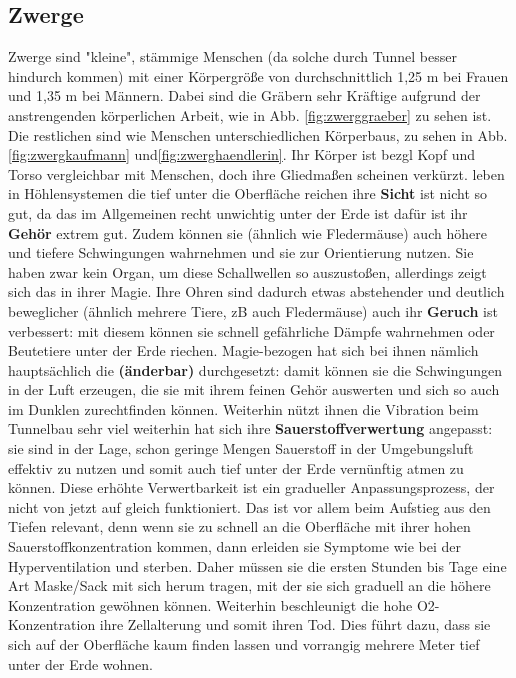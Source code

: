 \subsection{Zwerge} \label{rasse:zwerg}
\begin{outline}
	\1  Zwerge sind "kleine", stämmige Menschen (da solche durch Tunnel besser hindurch kommen) mit einer Körpergröße von durchschnittlich 1,25 m bei Frauen und 1,35 m bei Männern.
	 Dabei sind die Gräbern sehr Kräftige aufgrund der anstrengenden körperlichen Arbeit, wie in Abb. \ref{fig:zwerggraeber} zu sehen ist. 
	 Die restlichen sind wie Menschen unterschiedlichen Körperbaus, zu sehen in Abb. \ref{fig:zwergkaufmann} und\ref{fig:zwerghaendlerin}. 
	 Ihr Körper ist bezgl Kopf und Torso vergleichbar mit Menschen, doch ihre Gliedmaßen scheinen verkürzt.
	\1 leben in Höhlensystemen die tief unter die Oberfläche reichen
	\1 ihre \textbf{Sicht} ist nicht so gut, da das im Allgemeinen recht unwichtig unter der Erde ist
	\1 dafür ist ihr \textbf{Gehör} extrem gut. 
	Zudem können sie (ähnlich wie Fledermäuse) auch höhere und tiefere Schwingungen wahrnehmen und sie zur Orientierung nutzen. 
	Sie haben zwar kein Organ, um diese Schallwellen so auszustoßen, allerdings zeigt sich das in ihrer Magie. 
	Ihre Ohren sind dadurch etwas abstehender und deutlich beweglicher (ähnlich mehrere Tiere, zB auch Fledermäuse)
	\1 auch ihr \textbf{Geruch} ist verbessert: 
	mit diesem können sie schnell gefährliche Dämpfe wahrnehmen oder Beutetiere unter der Erde riechen.
	\1 Magie-bezogen hat sich bei ihnen nämlich hauptsächlich die \textbf{ (änderbar)} durchgesetzt: 
	damit können sie die Schwingungen in der Luft erzeugen, die sie mit ihrem feinen Gehör auswerten und sich so auch im Dunklen zurechtfinden können. 
	Weiterhin nützt ihnen die Vibration beim Tunnelbau sehr viel
	\1 weiterhin hat sich ihre \textbf{Sauerstoffverwertung} angepasst: 
	sie sind in der Lage, schon geringe Mengen Sauerstoff in der Umgebungsluft effektiv zu nutzen und somit auch tief unter der Erde vernünftig atmen zu können.
	Diese erhöhte Verwertbarkeit ist ein gradueller Anpassungsprozess, der nicht von jetzt auf gleich funktioniert. 
	Das ist vor allem beim Aufstieg aus den Tiefen relevant, denn wenn sie zu schnell an die Oberfläche mit ihrer hohen Sauerstoffkonzentration kommen, dann erleiden sie Symptome wie bei der Hyperventilation und sterben. 
	Daher müssen sie die ersten Stunden bis Tage eine Art Maske/Sack mit sich herum tragen, mit der sie sich graduell an die höhere Konzentration gewöhnen können. 
	Weiterhin beschleunigt die hohe O2-Konzentration ihre Zellalterung und somit ihren Tod. 
	Dies führt dazu, dass sie sich auf der Oberfläche kaum finden lassen  und vorrangig mehrere Meter tief unter der Erde wohnen.
\end{outline}

